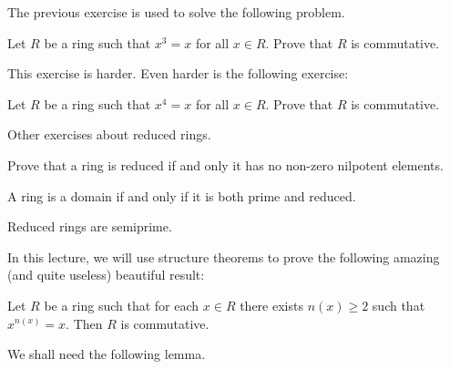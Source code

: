 The previous exercise is used to solve the following problem.

\begin{exercise}
    Let $R$ be a ring such that $x^3=x$ for all $x\in R$. Prove that
    $R$ is commutative. 
\end{exercise}

This exercise is harder. Even harder is the following exercise:

\begin{exercise}
    Let $R$ be a ring such that $x^4=x$ for all $x\in R$. Prove
    that $R$ is commutative. 
\end{exercise}

Other exercises about reduced rings. 

\begin{exercise}
\label{xca:reduced}
    Prove that a ring is reduced if 
    and only it has no non-zero nilpotent elements. 
\end{exercise}

\begin{exercise}
\label{xca:domain<=>prime+reduced}
    A ring is a domain if and only if
    it is both prime and reduced. 
\end{exercise}

\begin{exercise}
\label{xca:reduced=>semiprime}
    Reduced rings are semiprime.
\end{exercise}
    
In this lecture, we will use
structure theorems to prove the following amazing (and quite useless) 
beautiful result:

\begin{theorem}[Jacobson]
\label{thm:commutativity}
	Let $R$ be a ring such that 
	for each $x\in R$ there exists $n(x)\geq2$ such that 
	$x^{n(x)}=x$. Then $R$ is commutative. 
\end{theorem}

We shall need the following lemma.



